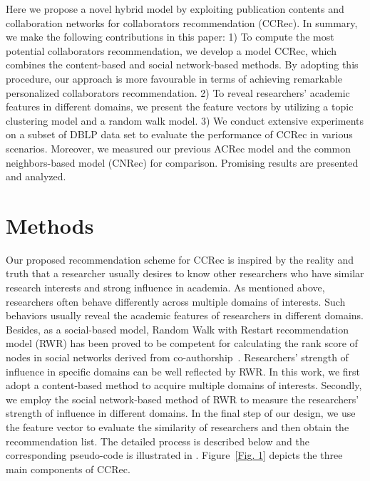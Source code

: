 \documentclass[10pt,letterpaper]{article}
\begin{document}
Here we propose a novel hybrid model by exploiting publication contents and collaboration networks for collaborators recommendation (CCRec). In summary, we make the following contributions in this paper: 1) To compute the most potential collaborators recommendation, we develop a model CCRec, which combines the content-based and social network-based methods. By adopting this procedure, our approach is more favourable in terms of achieving remarkable personalized collaborators recommendation. 2) To reveal researchers' academic features in different domains, we present the feature vectors by utilizing a topic clustering model and a random walk model. 3) We conduct extensive experiments on a subset of DBLP data set to evaluate the performance of CCRec in various scenarios. Moreover, we measured our previous ACRec model and the common neighbors-based model (CNRec) for comparison. Promising results are presented and analyzed.


\section*{Methods}
Our proposed recommendation scheme for CCRec is inspired by the reality and truth that a researcher usually desires to know other researchers who have similar research interests and strong influence in academia. As mentioned above, researchers often behave differently across multiple domains of interests. Such behaviors usually reveal the academic features of researchers in different domains. Besides, as a social-based model, Random Walk with Restart recommendation model (RWR) has been proved to be competent for calculating the rank score of nodes in social networks derived from co-authorship~\cite{li2014acrec}. Researchers' strength of influence in specific domains can be well reflected by RWR. In this work, we first adopt a content-based method to acquire multiple domains of interests. Secondly, we employ the social network-based method of RWR to measure the researchers' strength of influence in different domains. In the final step of our design, we use the feature vector to evaluate the similarity of researchers and then obtain the recommendation list. The detailed process is described below and the corresponding pseudo-code is illustrated in . Figure~\ref{Fig. 1} depicts the three main components of CCRec.
\end{document}
